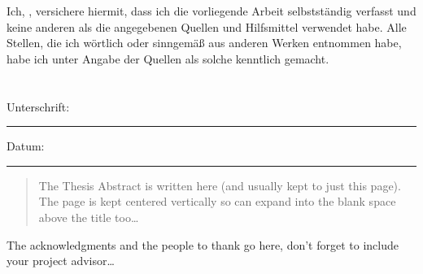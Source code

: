 \documentclass[11pt,english,singlespacing,headsepline]{MastersDoctoralThesis}
\begin{document}

\begin{declaration}
\addchaptertocentry{\authorshipname} %
\noindent Ich, \authorname, versichere hiermit, dass ich die vorliegende Arbeit selbstständig verfasst und keine anderen als die angegebenen Quellen und Hilfsmittel verwendet habe. Alle Stellen, die ich wörtlich oder sinngemäß aus anderen Werken entnommen habe, habe ich unter Angabe der Quellen als solche kenntlich gemacht.\\ \\ \\
 
\noindent Unterschrift:\\
\rule[0.5em]{25em}{0.5pt} %
 
\noindent Datum:\\
\rule[0.5em]{25em}{0.5pt} %
\end{declaration}

\cleardoublepage


\begin{abstract}
\addchaptertocentry{\abstractname} %
The Thesis Abstract is written here (and usually kept to just this page). The page is kept centered vertically so can expand into the blank space above the title too\ldots
\end{abstract}


\begin{acknowledgements}
\addchaptertocentry{\acknowledgementname} %
The acknowledgments and the people to thank go here, don't forget to include your project advisor\ldots
\end{acknowledgements}

\end{document}
